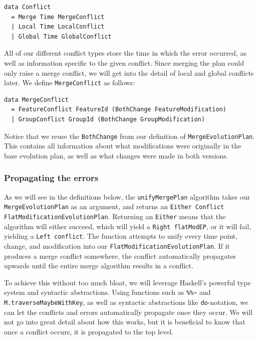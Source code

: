 \documentclass[a4paper,english]{ifimaster}
\begin{document}
\begin{verbatim}
data Conflict
  = Merge Time MergeConflict
  | Local Time LocalConflict
  | Global Time GlobalConflict
\end{verbatim}

All of our different conflict types store the time in which the error occurred, as well as information specific to the given conflict. Since merging the plan could only raise a merge conflict, we will get into the detail of local and global conflicts later. We define \texttt{MergeConflict} as follows:

\begin{verbatim}
data MergeConflict
  = FeatureConflict FeatureId (BothChange FeatureModification)
  | GroupConflict GroupId (BothChange GroupModification)
\end{verbatim}

Notice that we reuse the \texttt{BothChange} from our definition of \texttt{Merge\-Evolution\-Plan}. This contains all information about what modifications were originally in the base evolution plan, as well as what changes were made in both versions.

\subsubsection{Propagating the errors}%
\label{ssub:propagating_the_errors}

As we will see in the definitions below, the \texttt{unify\-Merge\-Plan} algorithm takes our \texttt{Merge\-Evolution\-Plan} as an argument, and returns an \texttt{Either Conflict Flat\-Modification\-Evolution\-Plan}. Returning an \texttt{Either} means that the algorithm will either succeed, which will yield a \texttt{Right flatModEP}, or it will fail, yielding a \texttt{Left conflict}. The function attempts to unify every time point, change, and modification into our \texttt{Flat\-Modification\-Evolution\-Plan}. If it produces a merge conflict somewhere, the conflict automatically propagates upwards until the entire merge algorithm results in a conflict.

To achieve this without too much bloat, we will leverage Haskell's powerful type system and syntactic abstractions. Using functions such as \texttt{\%\%\~} and \texttt{M.traverseMaybeWithKey}, as well as syntactic abstractions like \texttt{do}-notation, we can let the conflicts and errors automatically propagate once they occur. We will not go into great detail about how this works, but it is beneficial to know that once a conflict occurs, it is propagated to the top level.
\end{document}
